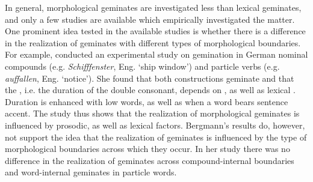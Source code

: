 In general,  morphological geminates are investigated less than  lexical geminates, and only a few studies are available which empirically investigated the matter. One prominent idea tested in the available studies is whether there is a difference in the realization of geminates with different types of morphological boundaries.
 For example, \cite{Bergmann.2017} conducted an experimental study on {gemination} in German nominal compounds (e.g. \textit{Schifffenster}, Eng. ‘{ship window}') and  particle verbs (e.g. \textit{auffallen}, Eng.  ‘{notice}'). She found that both constructions geminate and that the , i.e. the duration of the double consonant, depends on , as well as lexical . Duration is enhanced with low  words, as well as when a word bears sentence  accent. The study thus shows that the realization of  morphological geminates is influenced by prosodic, as well as lexical factors. Bergmann's results do, however, not support the idea that the realization of geminates is influenced by the type of morphological boundaries across which they occur. In her study there was no difference in the realization of geminates across compound-internal boundaries and word-internal geminates in particle words.


